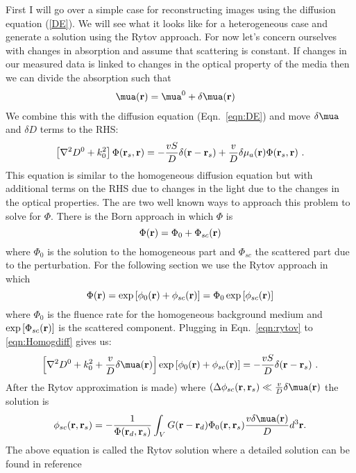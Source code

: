 First I will go over a simple case for reconstructing images using the diffusion equation (\ref{DE}). We will see what it looks like for a heterogeneous case and generate a solution using the Rytov approach. For now let's concern ourselves with changes in absorption and assume that scattering is constant. If changes in our measured data is linked to changes in the optical property of the media then we can divide the absorption such that
\begin{align}
\mua({\bf r}) &= \mua^0+\delta\mua({\bf r})
\end{align}
We combine this with the diffusion equation (Eqn.~\ref{eqn:DE}) and move $\delta\mua$ and $\delta D$ terms to the RHS: 
\begin{equation}
\label{eqn:Homogdiff}
\left[\nabla^2 D^0 + k_0^2 \right]\Phi({\bf r}_s,{\bf r})= -\frac{vS}{D}\delta({\bf r}-{\bf r}_s)+\frac{v}{D}\delta\mu_a({\bf r})\Phi({\bf r}_s,{\bf r})\ .
\end{equation}
This equation is similar to the homogeneous diffusion equation but with additional terms on the RHS due to changes in the light due to the changes in the optical properties. 
The are two well known ways to approach this problem to solve for $\Phi$. There is the Born approach in which $\Phi$ is
\begin{equation}
\Phi({\bf r}) = \Phi_0 + \Phi_{sc}({\bf r})
\end{equation}
where $\Phi_0$ is the solution to the homogeneous part and $\Phi_{sc}$ the scattered part due to the perturbation. For the following section we use the Rytov approach in which
\begin{equation}
\label{eqn:rytov}
\Phi({\bf r}) = \exp{[\phi_0({\bf r})+\phi_{sc}({\bf r})]} = \Phi_0 \exp{[\phi_{sc}({\bf r})]}
\end{equation}
where $\Phi_0$ is the fluence rate for the homogeneous background medium and $\exp{[\Phi_{sc}({\bf r})]}$ is the scattered component. Plugging in Eqn.~\ref{eqn:rytov} to \ref{eqn:Homogdiff} gives us: 
\begin{equation}
\label{eqn:Homogdiff2}
\left[\nabla^2 D^0 + k_0^2 + \frac{v}{D}\delta\mua({\bf r})\right]\exp{[\phi_0({\bf r})+\phi_{sc}({\bf r})]}= -\frac{vS}{D}\delta({\bf r}-{\bf r}_s)\ .
\end{equation}
After the Rytov approximation is made) where $(\Delta\phi_{sc}({\bf r},{\bf r}_s)\ll \frac{v}{D}\delta\mua({\bf r})$ the solution is 
\begin{equation}
\phi_{sc}({\bf r},{\bf r}_s) = - \frac{1}{\Phi({\bf r}_d,{\bf r}_s)}\int_V G({\bf r}-{\bf r}_d)\Phi_0({\bf r},{\bf r}_s)\frac{v\delta\mua({\bf r})}{D} d^3{\bf r}.
\end{equation}
The above equation is called the Rytov solution where a detailed solution can be found in reference \cite{OLeary1996a}
